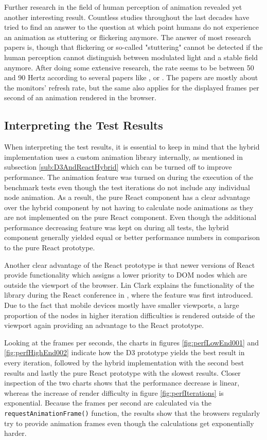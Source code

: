 Further research in the field of human perception of animation revealed yet another interesting result. Countless studies throughout the last decades have tried to find an answer to the question at which point humans do not experience an animation as stuttering or flickering anymore. The answer of most research papers is, though that flickering or so-called "stuttering" cannot be detected if the human perception cannot distinguish between modulated light and a stable field anymore. After doing some extensive research, the rate seems to be between 50 and 90 Hertz according to several papers like \cite{6375944}, \cite{farrell1987predicting} or \cite{stereoscopicFlickerArticle}. The papers are mostly about the monitors' refresh rate, but the same also applies for the displayed frames per second of an animation rendered in the browser.

\subsection{Interpreting the Test Results}

When interpreting the test results, it is essential to keep in mind that the hybrid implementation uses a custom animation library internally, as mentioned in subsection \ref{sub:D3AndReactHybrid} which can be turned off to improve performance. The animation feature was turned on during the execution of the benchmark tests even though the test iterations do not include any individual node animation. As a result, the pure React component has a clear advantage over the hybrid component by not having to calculate node animations as they are not implemented on the pure React component. Even though the additional performance decreasing feature was kept on during all tests, the hybrid component generally yielded equal or better performance numbers in comparison to the pure React prototype.

Another clear advantage of the React prototype is that newer versions of React provide functionality which assigns a lower priority to DOM nodes which are outside the viewport of the browser. Lin Clark explains the functionality of the library during the React conference in \cite{ReactReconcliliationVideo}, where the feature was first introduced. Due to the fact that mobile devices mostly have smaller viewports, a large proportion of the nodes in higher iteration difficulties is rendered outside of the viewport again providing an advantage to the React prototype.

Looking at the frames per seconds, the charts in figures \ref{fig:perfLowEnd001} and \ref{fig:perfHighEnd002} indicate how the D3 prototype yields the best result in every iteration, followed by the hybrid implementation with the second best results and lastly the pure React prototype with the slowest results. Closer inspection of the two charts shows that the performance decrease is linear, whereas the increase of render difficulty in figure \ref{fig:perfIterations} is exponential. Because the frames per second are calculated via the \texttt{requestAnimationFrame()} function, the results show that the browsers regularly try to provide animation frames even though the calculations get exponentially harder.

